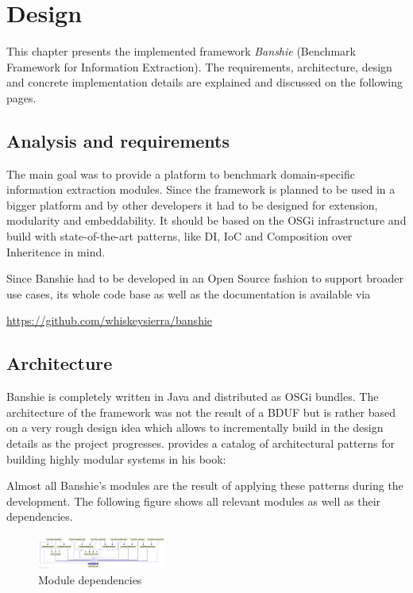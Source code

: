 \section{Design}
\label{sec:design}

This chapter presents the implemented framework \textit{Banshie} (Benchmark Framework for Information Extraction). The requirements, architecture, design and concrete implementation details are explained and discussed on the following pages.

\subsection{Analysis and requirements}
The main goal was to provide a platform to benchmark domain-specific information extraction modules. Since the framework is planned to be used in a bigger platform and by other developers it had to be designed for extension, modularity and embeddability. It should be based on the OSGi infrastructure and build with state-of-the-art patterns, like \gls{DI}, \gls{IoC} and Composition over Inheritence in mind.

Since Banshie had to be developed in an Open Source fashion to support broader use cases, its whole code base as well as the  documentation is available via

\url{https://github.com/whiskeysierra/banshie}

\subsection{Architecture}
Banshie is completely written in Java and distributed as OSGi bundles. The architecture of the framework was not the result of a \gls{BDUF} but is rather based on a very rough design idea which allows to incrementally build in the design details as the project progresses. \citeauthor{Knoernschild:2012} provides a catalog of architectural patterns for building highly modular systems in his book:  \cite{Knoernschild:2012}

Almost all Banshie's modules are the result of applying these patterns during the development. The following figure shows all relevant modules as well as their dependencies.

\newpage
\begin{figure}[H]
\centering
\includegraphics[angle=90, width=0.38\textwidth]{module-dependencies.png}
\caption{Module dependencies}
\label{fig:module-dependencies}
\end{figure}

